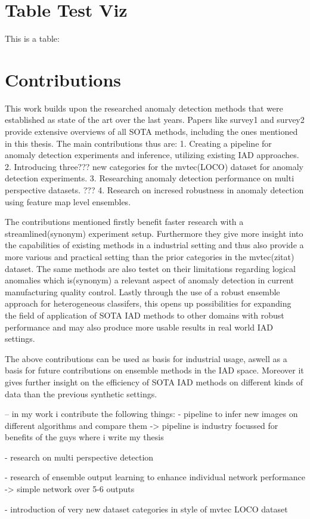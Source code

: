 \section{Table Test Viz}

This is a table:







\section{Contributions}
This work builds upon the researched anomaly detection methods that were established as state of the art over the last years. Papers like survey1 and survey2 provide extensive overviews of all SOTA methods,
including the ones mentioned in this thesis. The main contributions thus are:
1. Creating a pipeline for anomaly detection experiments and inference, utilizing existing IAD approaches. 
2. Introducing three??? new categories for the mvtec(LOCO) dataset for anomaly detection experiments.
3. Researching anomaly detection performance on multi perspective datasets. ???
4. Research on incresed robustness in anomaly detection using feature map level ensembles.

The contributions mentioned firstly benefit faster research with a streamlined(synonym) experiment setup. Furthermore they give more insight into the capabilities of existing methods in a 
industrial setting and thus also provide a more various and practical setting than the prior categories in the mvtec(zitat) dataset. The same methods are also testet on their limitations 
regarding logical anomalies which is(synonym) a relevant aspect of anomaly detection in current manufacturing quality control. Lastly through the use of a robust ensemble approach for heterogeneous 
classifers, this opens up possibilities for expanding the field of application of SOTA IAD methods to other domains with robust performance and may also produce more usable results in real world 
IAD settings.


The above contributions can be used as basis for industrial usage, aswell as a basis for future contributions on ensemble methods in the IAD space. Moreover it gives further insight on the
efficiency of SOTA IAD methods on different kinds of data than the previous synthetic settings.



-- in my work i contribute the following things:
- pipeline to infer new images on different algorithms and compare them
-> pipeline is industry focussed for benefits of the guys where i write my thesis

- research on multi perspective detection

- research of ensemble output learning to enhance individual network performance
-> simple network over 5-6 outputs

- introduction of very new dataset categories in style of mvtec LOCO dataset

